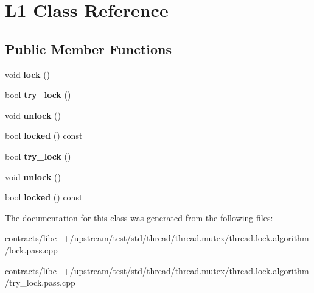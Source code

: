 \hypertarget{class_l1}{}\section{L1 Class Reference}
\label{class_l1}
\subsection*{Public Member Functions}
\begin{DoxyCompactItemize}
\item 
\mbox{\label{class_l1_a9a6fd338f3b661867a338b9baad29e98}} 
void {\bfseries lock} ()
\item 
\mbox{\label{class_l1_a5c3c0cada8e97c7ab1e4e35401aede3d}} 
bool {\bfseries try\+\_\+lock} ()
\item 
\mbox{\label{class_l1_a0cb6e0a0ed693ee682502d581a58b02e}} 
void {\bfseries unlock} ()
\item 
\mbox{\label{class_l1_a6ad5e2ca0de24b17fc59d6c715717e6a}} 
bool {\bfseries locked} () const
\item 
\mbox{\label{class_l1_a5c3c0cada8e97c7ab1e4e35401aede3d}} 
bool {\bfseries try\+\_\+lock} ()
\item 
\mbox{\label{class_l1_a0cb6e0a0ed693ee682502d581a58b02e}} 
void {\bfseries unlock} ()
\item 
\mbox{\label{class_l1_a6ad5e2ca0de24b17fc59d6c715717e6a}} 
bool {\bfseries locked} () const
\end{DoxyCompactItemize}


The documentation for this class was generated from the following files\+:\begin{DoxyCompactItemize}
\item 
contracts/libc++/upstream/test/std/thread/thread.\+mutex/thread.\+lock.\+algorithm/lock.\+pass.\+cpp\item 
contracts/libc++/upstream/test/std/thread/thread.\+mutex/thread.\+lock.\+algorithm/try\+\_\+lock.\+pass.\+cpp\end{DoxyCompactItemize}
